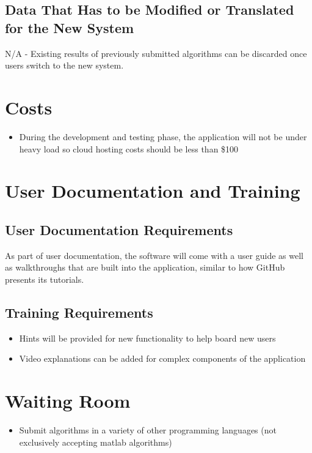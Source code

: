 \documentclass[12pt]{article}
\begin{document}
\subsection{Data That Has to be Modified or Translated for the New System}
N/A - Existing results of previously submitted algorithms can be discarded once users switch to the new system.

\section{Costs}
\begin{itemize}
    \item During the development and testing phase, the application will not be under heavy load so cloud hosting costs should be less than \$100
\end{itemize}

\section{User Documentation and Training}
\subsection{User Documentation Requirements}
As part of user documentation, the software will come with a user guide as well as walkthroughs that are built into the application, similar to how GitHub presents its tutorials.

\subsection{Training Requirements}
\begin{itemize}
    \item Hints will be provided for new functionality to help board new users
    \item Video explanations can be added for complex components of the application
\end{itemize}

\section{Waiting Room}
\begin{itemize}
    \item Submit algorithms in a variety of other programming languages (not exclusively accepting matlab algorithms)
\end{itemize}
\end{document}
